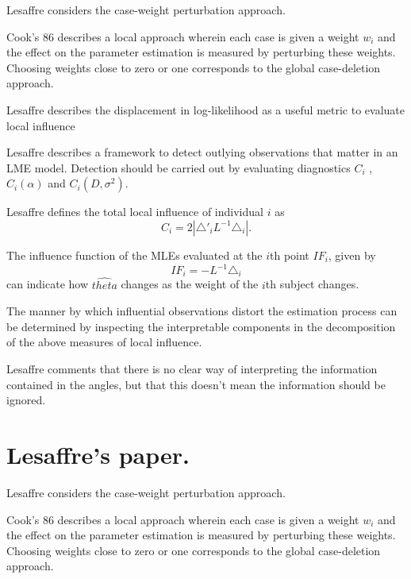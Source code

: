 \documentclass[Main.tex]{subfiles}
\begin{document}
Lesaffre considers the case-weight perturbation approach.


Cook's 86 describes a local approach wherein each case is given a weight $w_{i}$ and the effect on the parameter estimation is measured by perturbing these weights. Choosing weights close to zero or one corresponds to the global case-deletion approach.

Lesaffre  describes the displacement in log-likelihood as a useful metric to evaluate local influence %


Lesaffre describes a framework to detect outlying observations that matter in an LME model. Detection should be carried out by evaluating diagnostics $C_{i}$ , $C_{i}(\alpha)$ and $C_{i}(D,\sigma^2)$.


Lesaffre defines the total local influence of individual $i$ as
\begin{equation}
C_{i} = 2 | \triangle \prime _{i} L^{-1} \triangle_{i}|.
\end{equation}


The influence function of the MLEs evaluated at the $i$th point $IF_{i}$, given by
\begin{equation}
IF_{i} = -L^{-1}\triangle _{i}
\end{equation}
can indicate how $\hat{theta}$ changes as the weight of the $i$th
subject changes.

The manner by which influential observations distort the estimation process can be determined by inspecting the
interpretable components in the decomposition of the above measures of local influence.


Lesaffre comments that there is no clear way of interpreting the information contained in the angles, but that this doesn't mean the information should be ignored.

\newpage
\section{Lesaffre's paper.} %

Lesaffre considers the case-weight perturbation approach.


Cook's 86 describes a local approach wherein each case is given a weight $w_{i}$ and the effect on the parameter estimation is measured by perturbing these weights. Choosing weights close to zero or one corresponds to the global case-deletion approach.
\end{document}
